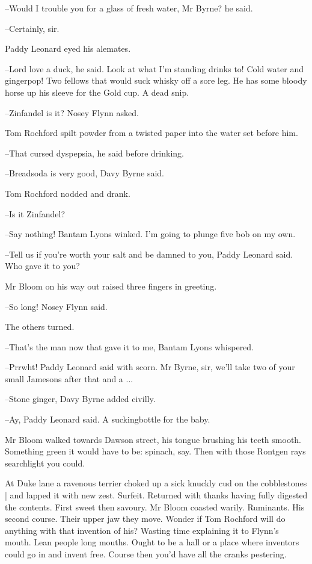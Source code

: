 --Would I trouble you for a glass of fresh water, Mr Byrne?
he said.

--Certainly, sir.

Paddy Leonard eyed his alemates.

--Lord love a duck,
he said.
Look at what I'm standing drinks to!
Cold water and gingerpop!
Two fellows that would suck whisky off a sore leg.
He has some bloody horse up his sleeve for the Gold cup.
A dead snip.

--Zinfandel is it?
Nosey Flynn asked.

Tom Rochford spilt powder from a twisted paper into the water set before him.

--That cursed dyspepsia,
he said before drinking.

--Breadsoda is very good,
Davy Byrne said.

Tom Rochford nodded and drank.

--Is it Zinfandel?

--Say nothing!
Bantam Lyons winked.
I'm going to plunge five bob on my own.

--Tell us if you're worth your salt and be damned to you,
Paddy Leonard said.
Who gave it to you?

Mr Bloom on his way out raised three fingers in greeting.

--So long!
Nosey Flynn said.

The others turned.

--That's the man now that gave it to me,
Bantam Lyons whispered.

--Prrwht!
Paddy Leonard said with scorn.
Mr Byrne, sir,
we'll take two of your small Jamesons after that and a ...

--Stone ginger,
Davy Byrne added civilly.

--Ay,
Paddy Leonard said.
A suckingbottle for the baby.

Mr Bloom walked towards Dawson street,
his tongue brushing his teeth smooth.
Something green it would have to be:
spinach, say.
Then with those Rontgen rays searchlight you could.

At Duke lane
a ravenous terrier choked up a sick knuckly cud on the cobblestones |
and lapped it with new zest.
Surfeit.
Returned with thanks having fully digested the contents.
First sweet then savoury.
Mr Bloom coasted warily.
Ruminants.
His second course.
Their upper jaw they move.
Wonder if Tom Rochford will do anything with that invention of his?
Wasting time explaining it to Flynn's mouth.
Lean people long mouths.
Ought to be a hall or a place where inventors could go in and invent free.
Course then you'd have all the cranks pestering.

